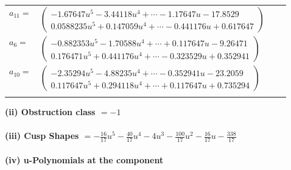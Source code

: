 \documentclass[1p]{elsarticle_modified}
\theoremstyle{definition}
\begin{document}
\begin{tabular}{m{7pt} m{180pt} m{7pt} m{180pt} }
\flushright $a_{11}=$&$\begin{pmatrix}-1.67647 u^{5}-3.44118 u^{4}+\cdots-1.17647 u-17.8529\\0.0588235 u^{5}+0.147059 u^{4}+\cdots-0.441176 u+0.617647\end{pmatrix}$ \\
\flushright $a_{6}=$&$\begin{pmatrix}-0.882353 u^{5}-1.70588 u^{4}+\cdots+0.117647 u-9.26471\\0.176471 u^{5}+0.441176 u^{4}+\cdots-0.323529 u+0.352941\end{pmatrix}$ \\
\flushright $a_{10}=$&$\begin{pmatrix}-2.35294 u^{5}-4.88235 u^{4}+\cdots-0.352941 u-23.2059\\0.117647 u^{5}+0.294118 u^{4}+\cdots+0.117647 u+0.735294\end{pmatrix}$\\&\end{tabular}
\flushleft \textbf{(ii) Obstruction class $= -1$}\\~\\
\flushleft \textbf{(iii) Cusp Shapes $= -\frac{16}{17} u^5-\frac{40}{17} u^4-4 u^3-\frac{100}{17} u^2-\frac{16}{17} u-\frac{338}{17}$}\\~\\
\newpage\renewcommand{\arraystretch}{1}
\flushleft \textbf{(iv) u-Polynomials at the component}\newline \\
\end{document}
